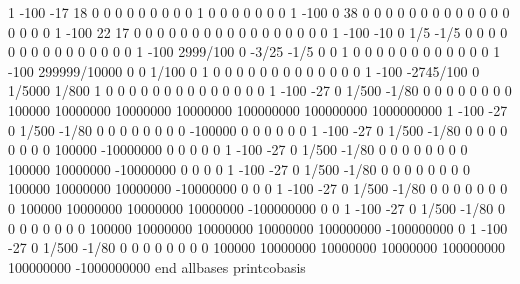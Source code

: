  1 -100  -17   18                 0    0          0         0         0            0             0             0             0             1        0         0         0         0          0          0           0
 1 -100    0   38                 0    0          0         0         0            0             0             0             0             0        0         0         0         0          0          0           0
 1 -100   22   17                 0    0          0         0         0            0             0             0             0             0        0         0         0         0          0          0           0
 1 -100  -10    0             1/5   -1/5          0         0         0            0             0             0             0             0        0         0         0         0          0          0           0
 1 -100  2999/100    0      -3/25   -1/5          0         0         1            0             0             0             0             0        0         0         0         0          0          0           0
 1 -100  299999/10000    0    0    1/100          0         1         0            0             0             0             0             0        0         0         0         0          0          0           0
 1 -100 -2745/100    0   1/5000    1/800          1         0         0            0             0             0             0             0        0         0         0         0          0          0           0
 1 -100  -27    0          1/500   -1/80          0         0         0            0             0             0             0             0   100000  10000000  10000000  10000000  100000000  100000000  1000000000
 1 -100  -27    0          1/500   -1/80          0         0         0            0             0             0             0             0  -100000         0         0         0          0          0           0
 1 -100  -27    0          1/500   -1/80          0         0         0            0             0             0             0             0   100000 -10000000         0         0          0          0           0
 1 -100  -27    0          1/500   -1/80          0         0         0            0             0             0             0             0   100000  10000000 -10000000         0          0          0           0
 1 -100  -27    0          1/500   -1/80          0         0         0            0             0             0             0             0   100000  10000000  10000000 -10000000          0          0           0
 1 -100  -27    0          1/500   -1/80          0         0         0            0             0             0             0             0   100000  10000000  10000000  10000000 -100000000          0           0
 1 -100  -27    0          1/500   -1/80          0         0         0            0             0             0             0             0   100000  10000000  10000000  10000000  100000000 -100000000           0
 1 -100  -27    0          1/500   -1/80          0         0         0            0             0             0             0             0   100000  10000000  10000000  10000000  100000000  100000000 -1000000000
end
allbases
printcobasis